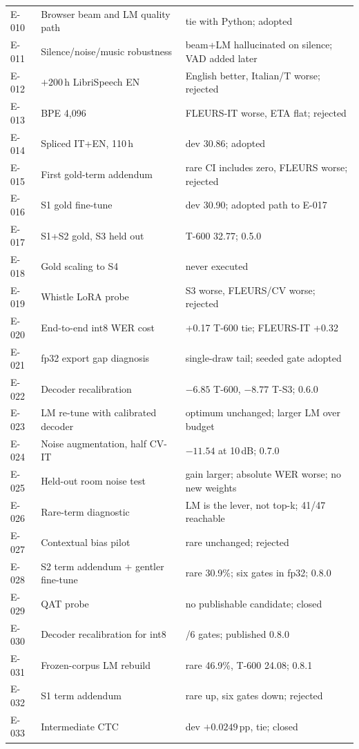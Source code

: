 \documentclass{article}
\begin{document}
\begin{longtable}{@{}p{1.05cm}>{\raggedright\arraybackslash}p{5.0cm}>{\raggedright\arraybackslash}p{8.0cm}@{}}
E-010 & Browser beam and LM quality path & tie with Python; adopted \\
E-011 & Silence/noise/music robustness & beam+LM hallucinated on silence; VAD added later \\
E-012 & $+200$\,h LibriSpeech EN & English better, Italian/T worse; rejected \\
E-013 & BPE 4{,}096 & FLEURS-IT worse, ETA flat; rejected \\
E-014 & Spliced IT+EN, 110\,h & dev 30.86; adopted \\
E-015 & First gold-term addendum & rare CI includes zero, FLEURS worse; rejected \\
E-016 & S1 gold fine-tune & dev 30.90; adopted path to E-017 \\
E-017 & S1+S2 gold, S3 held out & T-600 32.77; 0.5.0 \\
E-018 & Gold scaling to S4 & never executed \\
E-019 & Whistle LoRA probe & S3 worse, FLEURS/CV worse; rejected \\
E-020 & End-to-end int8 WER cost & +0.17 T-600 tie; FLEURS-IT +0.32 \\
E-021 & fp32 export gap diagnosis & single-draw tail; seeded gate adopted \\
E-022 & Decoder recalibration & $-6.85$ T-600, $-8.77$ T-S3; 0.6.0 \\
E-023 & LM re-tune with calibrated decoder & optimum unchanged; larger LM over budget \\
E-024 & Noise augmentation, half CV-IT & $-11.54$ at 10\,dB; 0.7.0 \\
E-025 & Held-out room noise test & gain larger; absolute WER worse; no new weights \\
E-026 & Rare-term diagnostic & LM is the lever, not top-k; 41/47 reachable \\
E-027 & Contextual bias pilot & rare unchanged; rejected \\
E-028 & S2 term addendum + gentler fine-tune & rare 30.9\%; six gates in fp32; 0.8.0 \\
E-029 & QAT probe & no publishable candidate; closed \\
E-030 & Decoder recalibration for int8 & 5/6 gates; published 0.8.0 \\
E-031 & Frozen-corpus LM rebuild & rare 46.9\%, T-600 24.08; 0.8.1 \\
E-032 & S1 term addendum & rare up, six gates down; rejected \\
E-033 & Intermediate CTC & dev $+0.0249$\,pp, tie; closed \\

\end{longtable}
\end{document}
